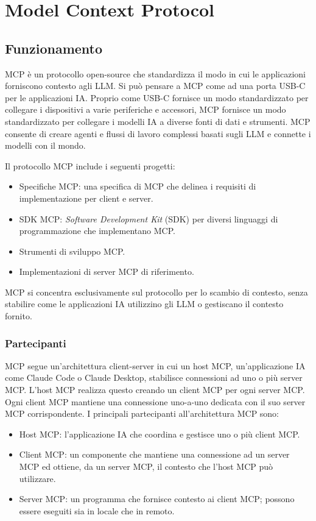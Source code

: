 \chapter{Model Context Protocol}

\section{Funzionamento}

MCP è un protocollo open-source che standardizza il modo in cui le applicazioni forniscono contesto agli LLM. Si può pensare a MCP come ad una porta USB-C per le applicazioni IA. Proprio come USB-C fornisce un modo standardizzato per collegare i dispositivi a varie periferiche e accessori, MCP fornisce un modo standardizzato per collegare i modelli IA a diverse fonti di dati e strumenti. MCP consente di creare agenti e flussi di lavoro complessi basati sugli LLM e connette i modelli con il mondo. 
\cite{modelcontextprotocol2024intro}

Il protocollo MCP include i seguenti progetti:
\begin{itemize}
\item Specifiche MCP: una specifica di MCP che delinea i requisiti di implementazione per client e server.
\item SDK MCP: \textit{Software Development Kit} (SDK) per diversi linguaggi di programmazione che implementano MCP.
\item Strumenti di sviluppo MCP.
\item Implementazioni di server MCP di riferimento.
\end{itemize}
MCP si concentra esclusivamente sul protocollo per lo scambio di contesto, senza stabilire come le applicazioni IA utilizzino gli LLM o gestiscano il contesto fornito.
\cite{modelcontextprotocol2024arch}

\subsection{Partecipanti}
MCP segue un'architettura client-server in cui un host MCP, un'applicazione IA come Claude Code o Claude Desktop, stabilisce connessioni ad uno o più server MCP. L'host MCP realizza questo creando un client MCP per ogni server MCP. Ogni client MCP mantiene una connessione uno-a-uno dedicata con il suo server MCP corrispondente.
I principali partecipanti all'architettura MCP sono:
\begin{itemize}
\item Host MCP: l'applicazione IA che coordina e gestisce uno o più client MCP.
\item Client MCP: un componente che mantiene una connessione ad un server MCP ed ottiene, da un server MCP, il contesto che l'host MCP può utilizzare.
\item Server MCP: un programma che fornisce contesto ai client MCP; possono essere eseguiti sia in locale che in remoto.
\cite{modelcontextprotocol2024arch}
\end{itemize}

